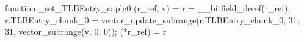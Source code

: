 function _set_TLBEntry_caplg0 (r_ref, v) = {
    r = __bitfield_deref(r_ref);
    r.TLBEntry_chunk_0 = vector_update_subrange(r.TLBEntry_chunk_0, 31, 31, vector_subrange(v, 0, 0));
    (*r_ref) = r
}
